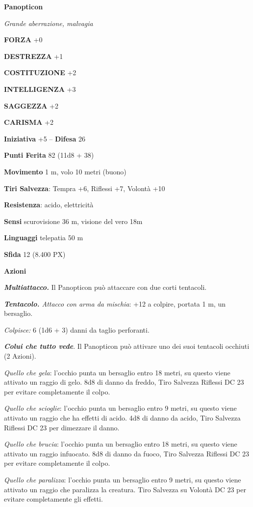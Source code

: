 \begin{multicols}{2}
	\medskip{}\textbf{Panopticon}

	\textit{Grande aberrazione, malvagia}

	\textbf{FORZA} +0

	\textbf{DESTREZZA} +1

	\textbf{COSTITUZIONE} +2

	\textbf{INTELLIGENZA} +3

	\textbf{SAGGEZZA} +2

	\textbf{CARISMA} +2

	\textbf{Iniziativa} +5 -- \textbf{Difesa} 26

	\textbf{Punti Ferita} 82 (11d8 + 38)

	\textbf{Movimento} 1 m, volo 10 metri (buono)

	\textbf{Tiri Salvezza}: Tempra +6, Riflessi +7, Volontà +10

	\textbf{Resistenza}: acido, elettricità

	\textbf{Sensi} scurovisione 36 m, visione del vero 18m

	\textbf{Linguaggi} telepatia 50 m

	\textbf{Sfida} 12 (8.400 PX)

	\textbf{Azioni}

	\textit{\textbf{Multiattacco.}} Il Panopticon può attaccare con due corti tentacoli.

	\textit{\textbf{Tentacolo.} Attacco con arma da mischia}: +12 a colpire, portata 1 m, un bersaglio.

	\textit{Colpisce:} 6 (1d6 + 3) danni da taglio perforanti.

	\textit{\textbf{Colui che tutto vede}}. Il Panopticon può attivare uno dei suoi tentacoli occhiuti (2 Azioni).

	\textit{Quello che gela}: l'occhio punta un bersaglio entro 18 metri, su questo viene attivato un raggio di gelo. 8d8 di danno da freddo, Tiro Salvezza Riflessi DC 23 per evitare completamente il colpo.

	\textit{Quello che scioglie}: l'occhio punta un bersaglio entro 9 metri, su questo viene attivato un raggio che ha effetti di acido. 4d8 di danno da acido, Tiro Salvezza Riflessi DC 23 per dimezzare il danno.

	\textit{Quello che brucia}: l'occhio punta un bersaglio entro 18 metri, su questo viene attivato un raggio infuocato. 8d8 di danno da fuoco, Tiro Salvezza Riflessi DC 23 per evitare completamente il colpo.

	\textit{Quello che paralizza}: l'occhio punta un bersaglio entro 9 metri, su questo viene attivato un raggio che paralizza la creatura. Tiro Salvezza su Volontà DC 23 per evitare completamente gli effetti.


\end{multicols}
